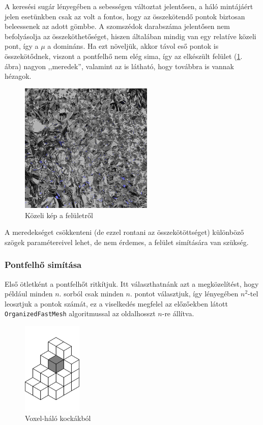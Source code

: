 \documentclass[a4paper,oneside]{article}
\begin{document}
A keresési sugár lényegében a sebességen változtat jelentősen, a háló mintájáért jelen esetünkben csak az volt a fontos, hogy az összekötendő pontok biztosan beleessenek az adott gömbbe. A szomszédok darabszáma jelentősen nem befolyásolja az összeköthetőséget, hiszen általában mindig van egy relatíve közeli pont, így a $\mu$ a domináns. Ha ezt növeljük, akkor távol eső pontok is összekötődnek, viszont a pontfelhő nem elég sima, így az elkészült felület (\ref{fig:greedy_closeup}. ábra) nagyon ,,meredek'', valamint az is látható, hogy továbbra is vannak hézagok.

\begin{figure}[tbh]
	\centering
	\includegraphics[width=180pt]{figs/greedy_closeup.png}
	\caption{Közeli kép a felületről \label{fig:greedy_closeup}}
\end{figure}

A meredekséget csökkenteni (de ezzel rontani az összekötöttséget) különböző szögek paramétereivel lehet, de nem érdemes, a felület simítására van szükség.

\subsubsection{Pontfelhő simítása}

Első ötletként a pontfelhőt ritkítjuk. Itt választhatnánk azt a megközelítést, hogy például minden $n$. sorból csak minden $n$. pontot választjuk, így lényegében $n^2$-tel leosztjuk a pontok számát, ez a viselkedés megfelel az előzőekben látott \texttt{OrganizedFastMesh} algoritmussal az oldalhosszt $n$-re állítva.

\begin{figure}[tbh]
	\centering
	\includegraphics[trim=0cm 6.5cm 0cm 6.5cm,width=80pt]{figs/voxels.pdf}
	\caption{Voxel-háló kockákból \label{fig:voxel_grid}}
\end{figure}
\end{document}
